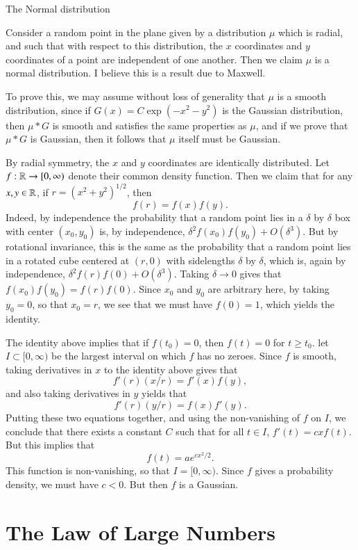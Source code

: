 The Normal distribution

Consider a random point in the plane given by a distribution $\mu$ which is radial, and such that with respect to this distribution, the $x$ coordinates and $y$ coordinates of a point are independent of one another. Then we claim $\mu$ is a normal distribution. I believe this is a result due to Maxwell.

To prove this, we may assume without loss of generality that $\mu$ is a smooth distribution, since if $G(x) = C \exp( -x^2 - y^2 )$ is the Gaussian distribution, then $\mu * G$ is smooth and satisfies the same properties as $\mu$, and if we prove that $\mu * G$ is Gaussian, then it follows that $\mu$ itself must be Gaussian.

By radial symmetry, the $x$ and $y$ coordinates are identically distributed. Let $f: \operatorname{\mathbb{R}} \to [0,\infty)$ denote their common density function. Then we claim that for any $x,y \in \operatorname{\mathbb{R}}$, if $r = (x^2 + y^2)^{1/2}$, then
%
\[ f(r) = f(x) f(y). \]
%
Indeed, by independence the probability that a random point lies in a $\delta$ by $\delta$ box with center $(x_0,y_0)$ is, by independence, $\delta^2 f(x_0) f(y_0) + O(\delta^3)$. But by rotational invariance, this is the same as the probability that a random point lies in a rotated cube centered at $(r,0)$ with sidelengths $\delta$ by $\delta$, which is, again by independence, $\delta^2 f(r) f(0) + O(\delta^3)$. Taking $\delta \to 0$ gives that $f(x_0) f(y_0) = f(r) f(0)$. Since $x_0$ and $y_0$ are arbitrary here, by taking $y_0 = 0$, so that $x_0 = r$, we see that we must have $f(0) = 1$, which yields the identity.

The identity above implies that if $f(t_0) = 0$, then $f(t) = 0$ for $t \geq t_0$. let $I \subset [0,\infty)$ be the largest interval on which $f$ has no zeroes. Since $f$ is smooth, taking derivatives in $x$ to the identity above gives that
%
\[ f'(r) (x / r) = f'(x) f(y), \]
%
and also taking derivatives in $y$ yields that
%
\[ f'(r) (y / r) = f(x) f'(y). \]
%
Putting these two equations together, and using the non-vanishing of $f$ on $I$, we conclude that there exists a constant $C$ such that for all $t \in I$, $f'(t) = c x f(t)$. But this implies that
%
\[ f(t) = a e^{cx^2/2}. \]
%
This function is non-vanishing, so that $I = [0,\infty)$. Since $f$ gives a probability density, we must have $c < 0$. But then $f$ is a Gaussian.







\chapter{The Law of Large Numbers}










